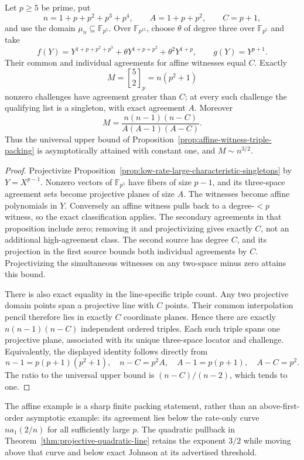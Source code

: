 \begin{corollary}
\label{cor:projective-linear-sharp-packing}
Let $p\ge5$ be prime, put
\[
 n=1+p+p^2+p^3+p^4,\qquad A=1+p+p^2,\qquad C=p+1,
\]
and use the domain $\mu_n\subseteq\mathbb F_{p^5}$.
Over $\mathbb F_{p^{15}}$, choose $\theta$ of degree three over
$\mathbb F_{p^5}$ and take
\[
 f(Y)=Y^{1+p+p^2+p^3}+\theta Y^{1+p+p^2}
          +\theta^2Y^{1+p},\qquad g(Y)=Y^{p+1}.
\]
Their common and individual agreements for affine witnesses equal $C$.
Exactly
\[
 M=\genfrac{[}{]}{0pt}{}{5}{2}_p=n(p^2+1)
\]
nonzero challenges have agreement greater than $C$; at every such
challenge the qualifying list is a singleton, with exact agreement $A$.
Moreover
\[
 M=\frac{n(n-1)(n-C)}{A(A-1)(A-C)}.
\]
Thus the universal upper bound of
Proposition~\ref{prop:affine-witness-triple-packing} is asymptotically
attained with constant one, and $M\sim n^{3/2}$.
\end{corollary}
\begin{proof}
Projectivize Proposition~\ref{prop:low-rate-large-characteristic-singletons}
by $Y=X^{p-1}$. Nonzero vectors of $\mathbb F_{p^5}$ have fibers of
size $p-1$, and its three-space agreement sets become projective planes
of size $A$. The witnesses become affine polynomials in $Y$.
Conversely an affine witness pulls back to a degree-$<p$ witness,
so the exact classification applies. The secondary agreements in that
proposition include zero; removing it and projectivizing gives exactly
$C$, not an additional high-agreement class.
The second source has degree $C$, and its projection in the first source
bounds both individual agreements by $C$. Projectivizing the simultaneous
witnesses on any two-space minus zero attains this bound.

There is also exact equality in the line-specific triple count.
Any two projective domain points span a projective line with $C$ points.
Their common interpolation pencil therefore lies in exactly $C$
coordinate planes. Hence there are exactly $n(n-1)(n-C)$ independent
ordered triples. Each such triple spans one projective plane, associated
with its unique three-space locator and challenge. Equivalently, the
displayed identity follows directly from
\[
 n-1=p(p+1)(p^2+1),\quad n-C=p^2A,\quad
 A-1=p(p+1),\quad A-C=p^2.
\]
The ratio to the universal upper bound is $(n-C)/(n-2)$, which tends
to one.
\end{proof}

The affine example is a sharp finite packing statement, rather than
an above-first-order asymptotic example: its agreement lies below the
rate-only curve $na_1(2/n)$ for all sufficiently large $p$.
The quadratic pullback in Theorem~\ref{thm:projective-quadratic-line}
retains the exponent $3/2$ while moving above that curve and below
exact Johnson at its advertised threshold.
